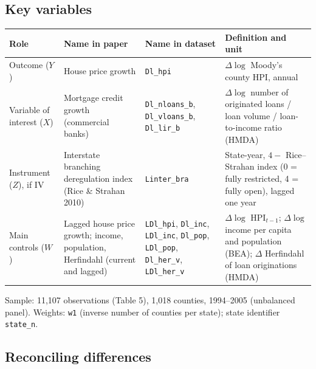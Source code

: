 \documentclass[12pt,a4paper]{article}
\renewcommand{\arraystretch}{1.25}
\begin{document}
\subsection{Key variables}

{\renewcommand{\arraystretch}{1.4}%
\begin{tabularx}{\textwidth}{@{}>{\raggedright\arraybackslash}p{}
  >{\raggedright\arraybackslash}p{}
  >{\raggedright\arraybackslash}p{}
  L@{}}
\toprule
Role & Name in paper & Name in dataset & Definition and unit \\
\midrule
Outcome ($Y$) & House price growth & \texttt{Dl\_hpi} & $\Delta\log$ Moody's county HPI, annual \\
Variable of interest ($X$) & Mortgage credit growth (commercial banks) & \texttt{Dl\_nloans\_b}, \texttt{Dl\_vloans\_b}, \texttt{Dl\_lir\_b} & $\Delta\log$ number of originated loans / loan volume / loan-to-income ratio (HMDA) \\
Instrument ($Z$), if IV & Interstate branching deregulation index (Rice \& Strahan 2010) & \texttt{Linter\_bra} & State-year, $4-$ Rice--Strahan index (0 = fully restricted, 4 = fully open), lagged one year \\
Main controls ($W$) & Lagged house price growth; income, population, Herfindahl (current and lagged) & \texttt{LDl\_hpi}, \texttt{Dl\_inc}, \texttt{LDl\_inc}, \texttt{Dl\_pop}, \texttt{LDl\_pop}, \texttt{Dl\_her\_v}, \texttt{LDl\_her\_v} & $\Delta\log$ HPI$_{t-1}$; $\Delta\log$ income per capita and population (BEA); $\Delta$ Herfindahl of loan originations (HMDA) \\
\bottomrule
\end{tabularx}}

\medskip\noindent
Sample: 11,107 observations (Table 5), 1,018 counties, 1994--2005 (unbalanced panel). Weights: \texttt{w1} (inverse number of counties per state); state identifier \texttt{state\_n}.

\subsection{Reconciling differences}
\end{document}
